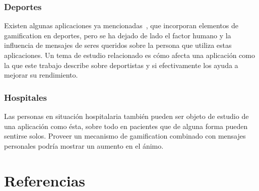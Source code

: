 \documentclass[12pt,letterpaper]{report}
\begin{document}
\subsubsection{Deportes}

Existen algunas aplicaciones ya mencionadas~\cite{zombiesrun}, que incorporan elementos de gamification en deportes,
pero se ha dejado de lado el factor humano y la influencia de mensajes de seres queridos sobre la persona que utiliza
estas aplicaciones. Un tema de estudio relacionado es cómo afecta una aplicación como la que este trabajo describe sobre
deportistas y si efectivamente los ayuda a mejorar su rendimiento.

\subsubsection{Hospitales}

Las personas en situación hospitalaria también pueden ser objeto de estudio de una aplicación como ésta, sobre todo en
pacientes que de alguna forma pueden sentirse solos. Proveer un mecanismo de gamification combinado con mensajes
personales podría mostrar un aumento en el ánimo.

\newpage
\section{Referencias}
\printbibliography[heading=none]
\end{document}
